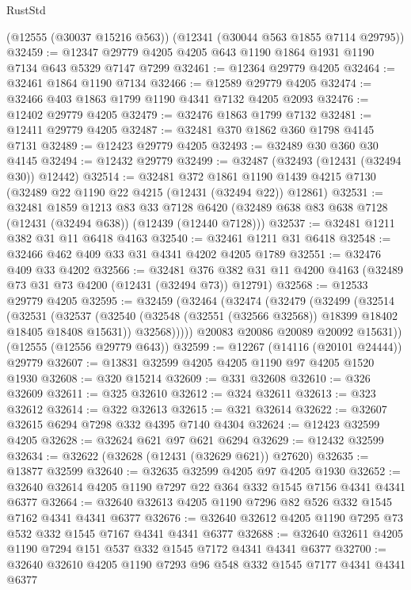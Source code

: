 \begin{lexlean}{RustStd}
\begin{coremodule}
    (@12555 (@30037 @15216 @563))
    (@12341 (@30044 @563 @1855 @7114 @29795))
@32459 := @12347 @29779 @4205 @4205 @643 @1190 @1864 @1931 @1190 @7134 @643 @5329 @7147 @7299
@32461 := @12364 @29779 @4205
@32464 := @32461 @1864 @1190 @7134
@32466 := @12589 @29779 @4205
@32474 := @32466 @403 @1863 @1799 @1190 @4341 @7132 @4205 @2093
@32476 := @12402 @29779 @4205
@32479 := @32476 @1863 @1799 @7132
@32481 := @12411 @29779 @4205
@32487 := @32481 @370 @1862 @360 @1798 @4145 @7131
@32489 := @12423 @29779 @4205
@32493 := @32489 @30 @360 @30 @4145
@32494 := @12432 @29779
@32499 := @32487 (@32493 (@12431 (@32494 @30)) @12442)
@32514 := @32481
    @372
    @1861
    @1190
    @1439
    @4215
    @7130
    (@32489 @22 @1190 @22 @4215 (@12431 (@32494 @22)) @12861)
@32531 := @32481
    @1859
    @1213
    @83
    @33
    @7128
    @6420
    (@32489 @638 @83 @638 @7128 (@12431 (@32494 @638)) (@12439 (@12440 @7128)))
@32537 := @32481 @1211 @382 @31 @11 @6418 @4163
@32540 := @32461 @1211 @31 @6418
@32548 := @32466 @462 @409 @33 @31 @4341 @4202 @4205 @1789
@32551 := @32476 @409 @33 @4202
@32566 := @32481
    @376
    @382
    @31
    @11
    @4200
    @4163
    (@32489 @73 @31 @73 @4200 (@12431 (@32494 @73)) @12791)
@32568 := @12533 @29779 @4205
@32595 := @32459
    (@32464
      (@32474
        (@32479
          (@32499
            (@32514
              (@32531
                (@32537
                  (@32540 (@32548 (@32551 (@32566 @32568)) @18399 @18402 @18405 @18408 @15631))
                  @32568)))))
        @20083
        @20086
        @20089
        @20092
        @15631))
    (@12555 (@12556 @29779 @643))
@32599 := @12267 (@14116 (@20101 @24444)) @29779
@32607 := @13831 @32599 @4205 @4205 @1190 @97 @4205 @1520 @1930
@32608 := @320 @15214
@32609 := @331 @32608
@32610 := @326 @32609
@32611 := @325 @32610
@32612 := @324 @32611
@32613 := @323 @32612
@32614 := @322 @32613
@32615 := @321 @32614
@32622 := @32607 @32615 @6294 @7298 @332 @4395 @7140 @4304
@32624 := @12423 @32599 @4205
@32628 := @32624 @621 @97 @621 @6294
@32629 := @12432 @32599
@32634 := @32622 (@32628 (@12431 (@32629 @621)) @27620)
@32635 := @13877 @32599
@32640 := @32635 @32599 @4205 @97 @4205 @1930
@32652 := @32640 @32614 @4205 @1190 @7297 @22 @364 @332 @1545 @7156 @4341 @4341 @6377
@32664 := @32640 @32613 @4205 @1190 @7296 @82 @526 @332 @1545 @7162 @4341 @4341 @6377
@32676 := @32640 @32612 @4205 @1190 @7295 @73 @532 @332 @1545 @7167 @4341 @4341 @6377
@32688 := @32640 @32611 @4205 @1190 @7294 @151 @537 @332 @1545 @7172 @4341 @4341 @6377
@32700 := @32640 @32610 @4205 @1190 @7293 @96 @548 @332 @1545 @7177 @4341 @4341 @6377

\end{coremodule}
\end{lexlean}
